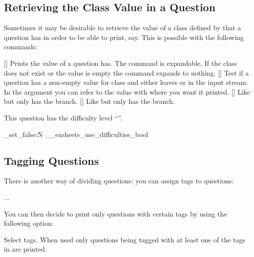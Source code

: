 \documentclass[load-preamble+]{cnltx-doc}
\begin{document}
\subsection{Retrieving the Class Value in a Question}\label{sec:retr-class-value}
Sometimes it may be desirable to retrieve the value of a class defined by
 that a question has in order to be able to print,
say.  This is possible with the following commands:
\begin{commands}
  \expandable{}[]
    Prints the value of  a question has.  The command is
    expandable.  If the class does not exist or the value is empty the command
    expands to nothing.
  []
    Test if a question has a non-empty value for class  and either
    leaves  or  in the input stream.  In the
     argument you can refer to the value with  where you
    want it printed.
  []
    Like  but only has the  branch.
  []
    Like  but only has the  branch.
\end{commands}

\begin{example}
  \begin{question}[difficulty=hard]
    This question has the difficulty level
    ``''.
  \end{question}
\end{example}

\ExplSyntaxOn
 \bool_set_false:N \g__exsheets_use_difficulties_bool
\ExplSyntaxOff

\subsection{Tagging Questions}
There is another way of dividing questions: you can assign
tags to questions:
\begin{sourcecode}
  \begin{question}[tags={foo,bar,baz}]
    ...
  \end{question}
\end{sourcecode}
You can then decide to print only questions with certain tags by using the
following option:
\begin{options}
    Select tags.  When used only questions being tagged with at least one of
    the tags in  are printed.
\end{options}
\end{document}
